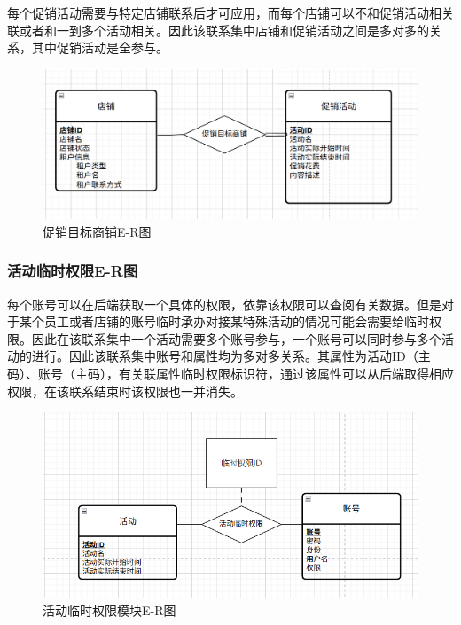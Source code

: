 \documentclass[]{article}
\let\oldincludegraphics\includegraphics
\renewcommand{\includegraphics}[2][]{%
  \begin{center}\oldincludegraphics[#1]{#2}\end{center}%
}
\begin{document}
每个促销活动需要与特定店铺联系后才可应用，而每个店铺可以不和促销活动相关联或者和一到多个活动相关。因此该联系集中店铺和促销活动之间是多对多的关系，其中促销活动是全参与。

\begin{figure}[htbp]
\centering
\includegraphics{image6.png}
\caption{促销目标商铺E-R图}
\end{figure}

\hypertarget{ux6d3bux52a8ux4e34ux65f6ux6743ux9650e-rux56fe}{%
\subsubsection{活动临时权限E-R图}\label{ux6d3bux52a8ux4e34ux65f6ux6743ux9650e-rux56fe}}

每个账号可以在后端获取一个具体的权限，依靠该权限可以查阅有关数据。但是对于某个员工或者店铺的账号临时承办对接某特殊活动的情况可能会需要给临时权限。因此在该联系集中一个活动需要多个账号参与，一个账号可以同时参与多个活动的进行。因此该联系集中账号和属性均为多对多关系。其属性为活动ID（主码）、账号（主码），有关联属性临时权限标识符，通过该属性可以从后端取得相应权限，在该联系结束时该权限也一并消失。

\begin{figure}[htbp]
\centering
\includegraphics{image7.png}
\caption{活动临时权限模块E-R图}
\end{figure}
\end{document}
